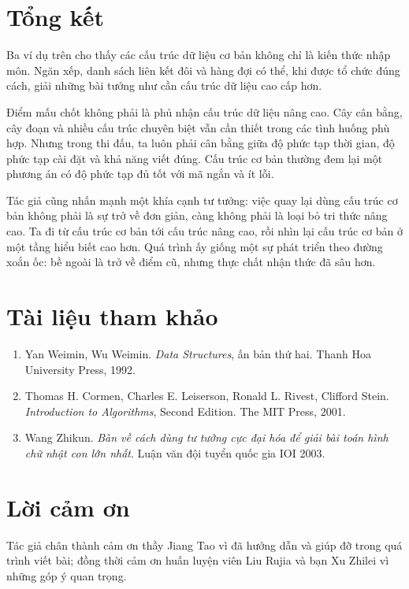 \documentclass[11pt]{article}
\begin{document}
\section{Tổng kết}

Ba ví dụ trên cho thấy các cấu trúc dữ liệu cơ bản không chỉ là kiến thức nhập
môn. Ngăn xếp, danh sách liên kết đôi và hàng đợi có thể, khi được tổ chức
đúng cách, giải những bài tưởng như cần cấu trúc dữ liệu cao cấp hơn.

Điểm mấu chốt không phải là phủ nhận cấu trúc dữ liệu nâng cao. Cây cân bằng,
cây đoạn và nhiều cấu trúc chuyên biệt vẫn cần thiết trong các tình huống phù
hợp. Nhưng trong thi đấu, ta luôn phải cân bằng giữa độ phức tạp thời gian,
độ phức tạp cài đặt và khả năng viết đúng. Cấu trúc cơ bản thường đem lại một
phương án có độ phức tạp đủ tốt với mã ngắn và ít lỗi.

Tác giả cũng nhấn mạnh một khía cạnh tư tưởng: việc quay lại dùng cấu trúc cơ
bản không phải là sự trở về đơn giản, càng không phải là loại bỏ tri thức nâng
cao. Ta đi từ cấu trúc cơ bản tới cấu trúc nâng cao, rồi nhìn lại cấu trúc cơ
bản ở một tầng hiểu biết cao hơn. Quá trình ấy giống một sự phát triển theo
đường xoắn ốc: bề ngoài là trở về điểm cũ, nhưng thực chất nhận thức đã sâu
hơn.

\section*{Tài liệu tham khảo}

\begin{enumerate}
  \item Yan Weimin, Wu Weimin. \textit{Data Structures}, ấn bản thứ hai.
  Thanh Hoa University Press, 1992.
  \item Thomas H. Cormen, Charles E. Leiserson, Ronald L. Rivest, Clifford
  Stein. \textit{Introduction to Algorithms}, Second Edition. The MIT Press,
  2001.
  \item Wang Zhikun. \textit{Bàn về cách dùng tư tưởng cực đại hóa để giải
  bài toán hình chữ nhật con lớn nhất}. Luận văn đội tuyển quốc gia IOI 2003.
\end{enumerate}

\section*{Lời cảm ơn}

Tác giả chân thành cảm ơn thầy Jiang Tao vì đã hướng dẫn và giúp đỡ trong quá
trình viết bài; đồng thời cảm ơn huấn luyện viên Liu Rujia và bạn Xu Zhilei
vì những góp ý quan trọng.
\end{document}
